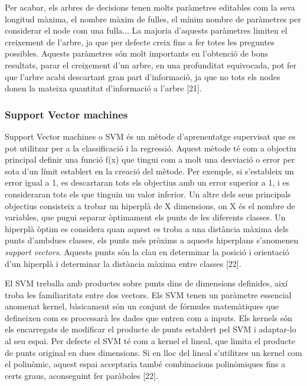 \documentclass[10pt,a4paper,twocolumn,twoside]{article}
\begin{document}
Per acabar, els arbres de decisions tenen molts paràmetres editables com la seva longitud màxima, el nombre màxim de fulles, el mínim nombre de paràmetres per considerar el node com una fulla... La majoria d'aquests paràmetres limiten el creixement de l'arbre, ja que per defecte creix fins a fer totes les preguntes possibles. Aquests paràmetres són molt importants en l'obtenció de bons resultats, parar el creixement d'un arbre, en una profunditat equivocada, pot fer que l'arbre acabi descartant gran part d'informació, ja que no tots els nodes donen la mateixa quantitat d'informació a l'arbre [21].
\subsubsection{Support Vector machines}
Support Vector machines o SVM és un mètode d'aprenentatge supervisat que es pot utilitzar per a la classificació i la regressió. Aquest mètode té com a objectiu principal definir una funció f(x) que tingui com a molt una desviació o error per sota d'un límit establert en la creació del mètode. Per exemple, si s'estableix un error igual a 1, es descartaran tots els objectius amb un error superior a 1, i es consideraran tots els que tinguin un valor inferior. Un altre dels seus principals objectius consisteix a trobar un hiperplà de X dimensions, on X és el nombre de variables, que pugui separar òptimament els punts de les diferents classes. Un hiperplà òptim es considera quan aquest es troba a una distància màxima dels punts d'ambdues classes, els punts més pròxims a aquests hiperplans s'anomenen \textit{support vectors}. Aquests punts són la clau en determinar la posició i orientació d'un hiperplà i determinar la distància màxima entre classes [22].

El SVM treballa amb productes sobre punts dins de dimensions definides, així troba les familiaritats entre dos vectors. Els SVM tenen un paràmetre essencial anomenat kernel, bàsicament són un conjunt de fórmules matemàtiques que defineixen com es processarà les dades que entren com a inputs. Els kernels són els encarregats de modificar el producte de punts establert pel SVM i adaptar-lo al seu espai. Per defecte el SVM té com a kernel el lineal, que limita el producte de punts original en dues dimensions. Si en lloc del lineal s'utilitzes un kernel com el polinòmic, aquest espai acceptaria també combinacions polinòmiques fins a certs graus, aconseguint fer paràboles [22].
\end{document}
